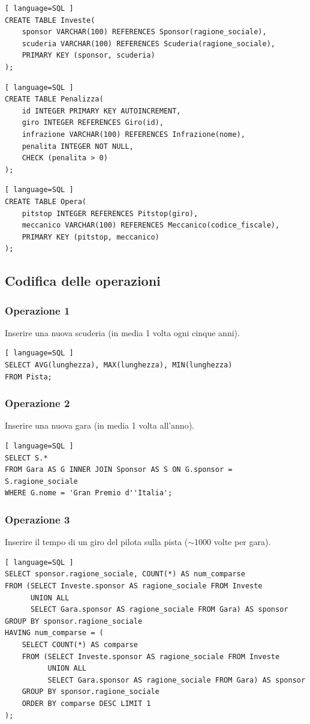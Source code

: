 \documentclass[11pt]{article}
\begin{document}
\begin{lstlisting}[ language=SQL ]
CREATE TABLE Investe(
    sponsor VARCHAR(100) REFERENCES Sponsor(ragione_sociale),
    scuderia VARCHAR(100) REFERENCES Scuderia(ragione_sociale),
    PRIMARY KEY (sponsor, scuderia)
);
\end{lstlisting}

\begin{lstlisting}[ language=SQL ]
CREATE TABLE Penalizza(
    id INTEGER PRIMARY KEY AUTOINCREMENT,
    giro INTEGER REFERENCES Giro(id),
    infrazione VARCHAR(100) REFERENCES Infrazione(nome),
    penalita INTEGER NOT NULL,
    CHECK (penalita > 0)
);
\end{lstlisting}

\begin{lstlisting}[ language=SQL ]
CREATE TABLE Opera(
    pitstop INTEGER REFERENCES Pitstop(giro),
    meccanico VARCHAR(100) REFERENCES Meccanico(codice_fiscale),
    PRIMARY KEY (pitstop, meccanico)
);
\end{lstlisting}

\subsection{Codifica delle operazioni}

\subsubsection{Operazione 1}
Inserire una nuova scuderia (in media 1 volta ogni cinque anni).
\begin{lstlisting}[ language=SQL ]
SELECT AVG(lunghezza), MAX(lunghezza), MIN(lunghezza)
FROM Pista;
\end{lstlisting}


\subsubsection{Operazione 2}
Inserire una nuova gara (in media 1 volta all'anno).
\begin{lstlisting}[ language=SQL ]
SELECT S.*
FROM Gara AS G INNER JOIN Sponsor AS S ON G.sponsor = S.ragione_sociale
WHERE G.nome = 'Gran Premio d''Italia'; 
\end{lstlisting}


\subsubsection{Operazione 3}
Inserire il tempo di un giro del pilota sulla pista ($\sim$1000 volte per gara).
\begin{lstlisting}[ language=SQL ]
SELECT sponsor.ragione_sociale, COUNT(*) AS num_comparse
FROM (SELECT Investe.sponsor AS ragione_sociale FROM Investe 
      UNION ALL 
      SELECT Gara.sponsor AS ragione_sociale FROM Gara) AS sponsor
GROUP BY sponsor.ragione_sociale
HAVING num_comparse = (
    SELECT COUNT(*) AS comparse
    FROM (SELECT Investe.sponsor AS ragione_sociale FROM Investe 
          UNION ALL 
          SELECT Gara.sponsor AS ragione_sociale FROM Gara) AS sponsor
    GROUP BY sponsor.ragione_sociale
    ORDER BY comparse DESC LIMIT 1
);
\end{lstlisting}
\end{document}
